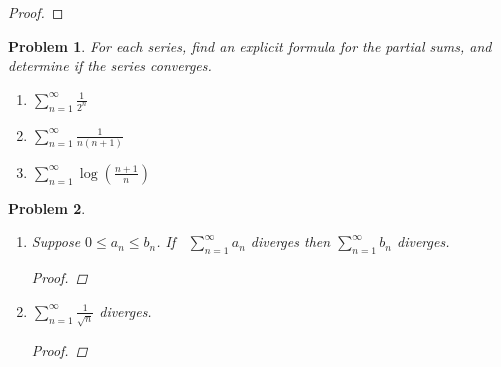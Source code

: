\documentclass[12pt]{article}
\newtheorem{problem}{Problem}
\begin{document}
\begin{proof}
\end{proof}


\begin{problem} %
For each series, find an explicit formula for the partial sums, and determine if the series converges.

\renewcommand{\labelenumi}{(\alph{enumi})}
\begin{enumerate}
\item $\displaystyle \sum_{n=1}^\infty \frac{1}{2^n}$


\item $\displaystyle \sum_{n=1}^\infty \frac{1}{n(n+1)}$


\item $\displaystyle \sum_{n=1}^\infty \log\left(\frac{n+1}{n}\right)$  %


\end{enumerate}
\end{problem}


\begin{problem} %
\phantom{foo}


\renewcommand{\labelenumi}{(\alph{enumi})}
\begin{enumerate}
\item Suppose $0 \le a_n \le b_n$.  If \, $\displaystyle \sum_{n=1}^\infty a_n$ diverges then $\displaystyle \sum_{n=1}^\infty b_n$ diverges.

\begin{proof}
\end{proof}

\item $\displaystyle \sum_{n=1}^\infty \frac{1}{\sqrt{n}}$ diverges.

\begin{proof}
\end{proof}

\end{enumerate}
\end{problem}
\end{document}

